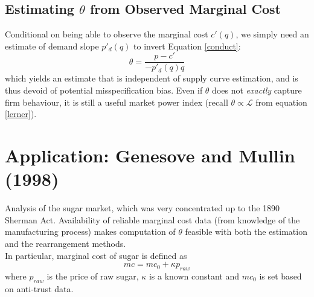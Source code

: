 \documentclass[11pt]{article}
\numberwithin{equation}{section}
\begin{document}
\subsection{Estimating $\theta$ from Observed Marginal Cost}

Conditional on being able to observe the marginal cost $c'(q)$, we simply need an estimate of demand slope $p'_d(q)$ to invert Equation \eqref{conduct}:
\begin{equation}
	\theta = \frac{p - c'}{- p'_d(q)q}
\end{equation}
which yields an estimate that is independent of supply curve estimation, and is thus devoid of potential misspecification bias. Even if $\theta$ does not \textit{exactly} capture firm behaviour, it is still a useful market power index (recall $\theta \propto \mathcal{L}$ from equation \eqref{lerner}).

\section{Application: Genesove and Mullin (1998)}

Analysis of the sugar market, which was very concentrated up to the 1890 Sherman Act. Availability of reliable marginal cost data (from knowledge of the manufacturing process) makes computation of $\theta$ feasible with both the estimation and the rearrangement methods. \\
In particular, marginal cost of sugar is defined as
\vspace{-.25cm}
\begin{equation}
	mc = mc_0 + \kappa p_{raw}
\end{equation}
where $p_{raw}$ is the price of raw sugar, $\kappa$ is a known constant and $mc_0$ is set based on anti-trust data.
\end{document}
